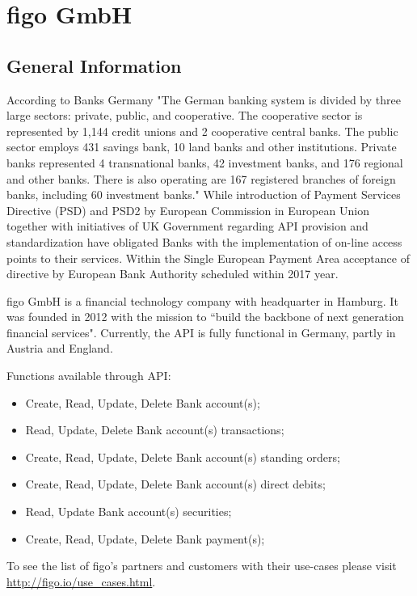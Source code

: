 \chapter{figo GmbH}
\section{General Information}
 According to Banks Germany\cite{listOfBanks} "The German banking system is divided by three large sectors: private, public, and cooperative. The cooperative sector is represented by 1,144 credit unions and 2 cooperative central banks. The public sector employs 431 savings bank, 10 land banks and other institutions. Private banks represented 4 transnational banks, 42 investment banks, and 176 regional and other banks. There is also operating are 167 registered branches of foreign banks, including 60 investment banks." While introduction of Payment Services Directive (PSD) and PSD2 by European Commission in European Union together with initiatives of  UK Government regarding API provision and standardization have obligated Banks with the implementation of on-line access points to their services\cite{LarsAPI}\cite{TimAPI}\cite{DaveAPI}. Within the Single European Payment Area acceptance of directive by European Bank Authority scheduled within 2017 year\cite{PSD2}.

figo GmbH is a financial technology company with headquarter in Hamburg. It was founded in 2012  with the mission to “build the backbone of next generation financial services"\cite{figoFAQVision}.  Currently, the API is fully functional in Germany, partly in Austria and England.\cite{figoAngel}\cite{figoCB}

Functions available through API:\cite{figoAPI}
\begin{itemize}
	\item Create, Read, Update, Delete Bank account(s);
	\item Read, Update, Delete Bank account(s) transactions;
	\item Create, Read, Update, Delete Bank account(s) standing orders;
	\item Create, Read, Update, Delete Bank account(s) direct debits;
	\item Read, Update  Bank account(s) securities;
	\item Create, Read, Update, Delete Bank payment(s);
\end{itemize}
To see the list of figo's partners and customers with their use-cases please visit \url{http://figo.io/use\_cases.html}.

